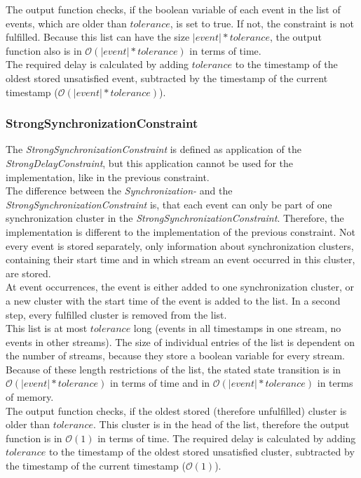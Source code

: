	The output function checks, if the boolean variable of each event in the list of events, which are older than $tolerance$, is set to true. If not, the constraint is not fulfilled. Because this list can have the size $|event|*tolerance$, the output function also is in $\mathcal{O}(|event|*tolerance)$ in terms of time.\\
	The required delay is calculated by adding $tolerance$ to the timestamp of the oldest stored unsatisfied event, subtracted by the timestamp of the current timestamp ($\mathcal{O}(|event|*tolerance)$).
	
\subsubsection{StrongSynchronizationConstraint}
	The \emph{StrongSynchronizationConstraint} is defined as application of the \emph{StrongDelayConstraint}, but this application cannot be used for the implementation, like in the previous constraint.\\
	The difference between the \emph{Synchronization-} and the \emph{StrongSynchronizationConstraint} is, that each event can only be part of one synchronization cluster in the \emph{StrongSynchronizationConstraint}. Therefore, the implementation is different to the implementation of the previous constraint. Not every event is stored separately, only information about synchronization clusters, containing their start time and in which stream an event occurred in this cluster, are stored.\\
	At event occurrences, the event is either added to one synchronization cluster, or a new cluster with the start time of the event is added to the list. In a second step, every fulfilled cluster is removed from the list.\\
	This list is at most $tolerance$ long (events in all timestamps in one stream, no events in other streams). The size of individual entries of the list is dependent on the number of streams, because they store a boolean variable for every stream. Because of these length restrictions of the list, the stated state transition is in $\mathcal{O}(|event|*tolerance)$ in terms of time and in $\mathcal{O}(|event|*tolerance)$ in terms of memory.\\
	The output function checks, if the oldest stored (therefore unfulfilled) cluster is older than $tolerance$. This cluster is in the head of the list, therefore the output function is in $\mathcal{O}(1)$ in terms of time. The required delay is calculated by adding $tolerance$ to the timestamp of the oldest stored unsatisfied cluster, subtracted by the timestamp of the current timestamp ($\mathcal{O}(1)$).
	
